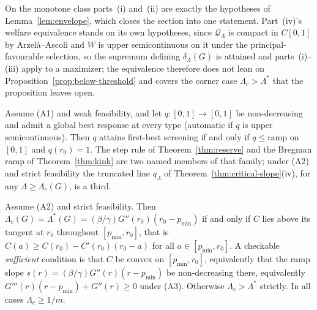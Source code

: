 \documentclass[acmsmall,nonacm,screen]{acmart}
\theoremstyle{acmplain}%
\theoremstyle{acmdefinition}%
\numberwithin{equation}{section}
\begin{document}
On the monotone class parts~(i) and~(ii) are exactly the hypotheses of Lemma~\ref{lem:envelope}, which closes the section into one statement. Part~(iv)'s welfare equivalence stands on its own hypotheses, since $\mathcal Q_\Lambda$ is compact in $C[0,1]$ by Arzel\`a--Ascoli and $W$ is upper semicontinuous on it under the principal-favourable selection, so the supremum defining $\delta_\Lambda(G)$ is attained and parts~(i)--(iii) apply to a maximizer; the equivalence therefore does not lean on Proposition~\ref{prop:below-threshold} and covers the corner case $\Lambda_c > \Lambda^*$ that the proposition leaves open.

\begin{corollary}\label{cor:first-best}
Assume (A1) and weak feasibility, and let $q : [0,1] \to [0,1]$ be non-decreasing and admit a global best response at every type (automatic if $q$ is upper semicontinuous). Then $q$ attains first-best screening if and only if $q \le \mathrm{ramp}$ on $[0,1]$ and $q(r_0) = 1$. The step rule of Theorem~\ref{thm:reserve} and the Bregman ramp of Theorem~\ref{thm:kink} are two named members of that family; under (A2) and strict feasibility the truncated line $q_\Lambda$ of Theorem~\ref{thm:critical-slope}(iv), for any $\Lambda \ge \Lambda_c(G)$, is a third.
\end{corollary}

\begin{corollary}\label{cor:lambda-star}
Assume (A2) and strict feasibility. Then $\Lambda_c(G) = \Lambda^*(G) = (\beta/\gamma) G''(r_0)(r_0 - p_{\min})$ if and only if $C$ lies above its tangent at $r_0$ throughout $[p_{\min},r_0]$, that is $C(a) \ge C(r_0) - C'(r_0)(r_0-a)$ for all $a \in [p_{\min},r_0]$. A checkable \emph{sufficient} condition is that $C$ be convex on $[p_{\min},r_0]$, equivalently that the ramp slope $s(r) = (\beta/\gamma)G''(r)(r-p_{\min})$ be non-decreasing there, equivalently $G'''(r)(r-p_{\min}) + G''(r) \ge 0$ under (A3). Otherwise $\Lambda_c > \Lambda^*$ strictly. In all cases $\Lambda_c \ge 1/m$.
\end{corollary}
\end{document}
